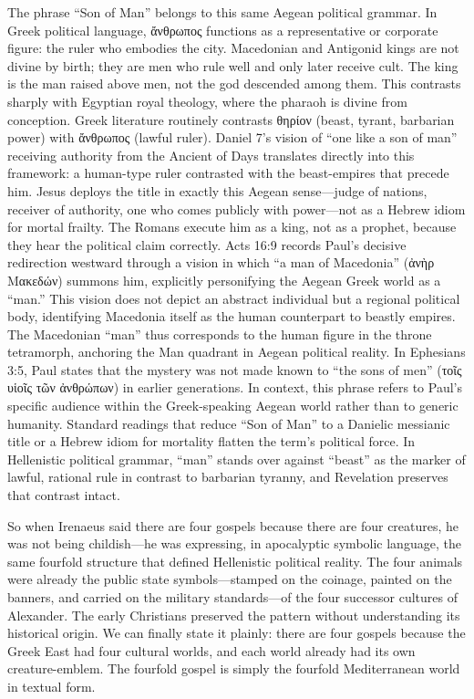 The phrase ``Son of Man'' belongs to this same Aegean political grammar.
In Greek political language, ἄνθρωπος functions as a representative or corporate figure: the ruler who embodies the city.
Macedonian and Antigonid kings are not divine by birth; they are men who rule well and only later receive cult.
The king is the man raised above men, not the god descended among them.
This contrasts sharply with Egyptian royal theology, where the pharaoh is divine from conception.
Greek literature routinely contrasts θηρίον (beast, tyrant, barbarian power) with ἄνθρωπος (lawful ruler).
Daniel 7's vision of ``one like a son of man'' receiving authority from the Ancient of Days translates directly into this framework: a human-type ruler contrasted with the beast-empires that precede him.
Jesus deploys the title in exactly this Aegean sense---judge of nations, receiver of authority, one who comes publicly with power---not as a Hebrew idiom for mortal frailty.
The Romans execute him as a king, not as a prophet, because they hear the political claim correctly.
Acts 16:9 records Paul's decisive redirection westward through a vision in which ``a man of Macedonia'' (ἀνὴρ Μακεδών) summons him, explicitly personifying the Aegean Greek world as a ``man.''
This vision does not depict an abstract individual but a regional political body, identifying Macedonia itself as the human counterpart to beastly empires.
The Macedonian ``man'' thus corresponds to the human figure in the throne tetramorph, anchoring the Man quadrant in Aegean political reality.
In Ephesians 3:5, Paul states that the mystery was not made known to ``the sons of men'' (τοῖς υἱοῖς τῶν ἀνθρώπων) in earlier generations.
In context, this phrase refers to Paul's specific audience within the Greek-speaking Aegean world rather than to generic humanity.
Standard readings that reduce ``Son of Man'' to a Danielic messianic title or a Hebrew idiom for mortality flatten the term's political force.
In Hellenistic political grammar, ``man'' stands over against ``beast'' as the marker of lawful, rational rule in contrast to barbarian tyranny, and Revelation preserves that contrast intact.

So when Irenaeus said there are four gospels because there are four creatures, he was not being childish---he was expressing, in apocalyptic symbolic language, the same fourfold structure that defined Hellenistic political reality.
The four animals were already the public state symbols---stamped on the coinage, painted on the banners, and carried on the military standards---of the four successor cultures of Alexander.
The early Christians preserved the pattern without understanding its historical origin.
We can finally state it plainly: there are four gospels because the Greek East had four cultural worlds, and each world already had its own creature-emblem.
The fourfold gospel is simply the fourfold Mediterranean world in textual form.

